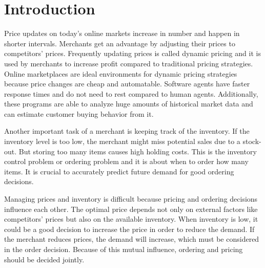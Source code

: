 
\chapter{Introduction}
Price updates on today's online markets increase in number and happen in shorter intervals.
Merchants get an advantage by adjusting their prices to competitors' prices.
Frequently updating prices is called dynamic pricing and it is used by merchants to increase profit compared to traditional pricing strategies.
Online marketplaces are ideal environments for dynamic pricing strategies because price changes are cheap and automatable.
Software agents have faster response times and do not need to rest compared to human agents.
Additionally, these programs are able to analyze huge amounts of historical market data and can estimate customer buying behavior from it.

Another important task of a merchant is keeping track of the inventory.
If the inventory level is too low, the merchant might miss potential sales due to a stock-out.
But storing too many items causes high holding costs.
This is the inventory control problem or ordering problem and it is about when to order how many items.
It is crucial to accurately predict future demand for good ordering decisions.

Managing prices and inventory is difficult because pricing and ordering decisions influence each other.
The optimal price depends not only on external factors like competitors' prices but also on the available inventory.
When inventory is low, it could be a good decision to increase the price in order to reduce the demand.
If the merchant reduces prices, the demand will increase, which must be considered in the order decision.
Because of this mutual influence, ordering and pricing should be decided jointly.

